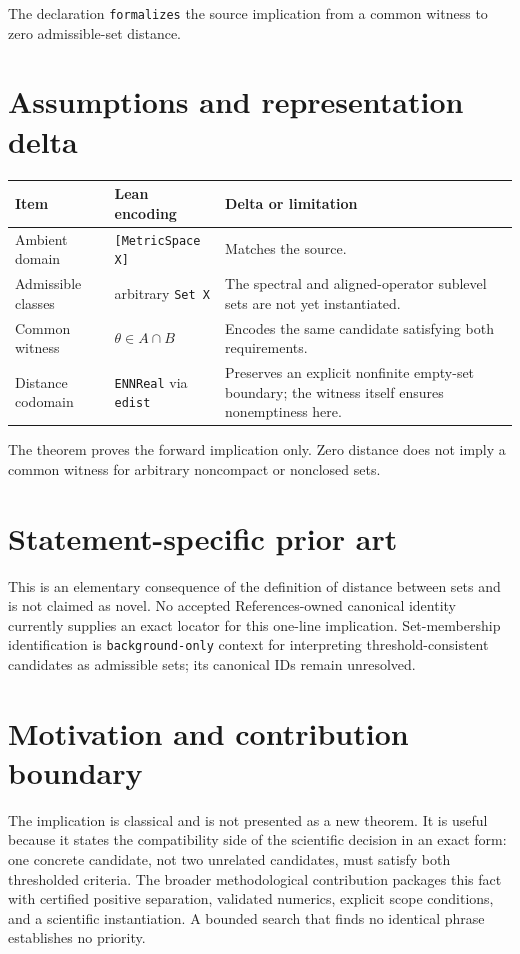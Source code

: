\documentclass[11pt]{article}
\begin{document}
The declaration \texttt{formalizes} the source implication from a common witness to
zero admissible-set distance.

\section{Assumptions and representation delta}

\begin{tabularx}{\textwidth}{@{}l>{\raggedright\arraybackslash}X>{\raggedright\arraybackslash}X@{}}
\toprule
Item & Lean encoding & Delta or limitation \\
\midrule
Ambient domain & \texttt{[MetricSpace X]} & Matches the source. \\
Admissible classes & arbitrary \texttt{Set X} & The spectral and aligned-operator sublevel sets are not yet instantiated. \\
Common witness & $\theta\in A\cap B$ & Encodes the same candidate satisfying both requirements. \\
Distance codomain & \texttt{ENNReal} via \texttt{edist} & Preserves an explicit nonfinite empty-set boundary; the witness itself ensures nonemptiness here. \\
\bottomrule
\end{tabularx}

The theorem proves the forward implication only. Zero distance does not imply a common
witness for arbitrary noncompact or nonclosed sets.

\section{Statement-specific prior art}

This is an elementary consequence of the definition of distance between sets and is not
claimed as novel. No accepted References-owned canonical identity currently supplies an
exact locator for this one-line implication. Set-membership identification is
\texttt{background-only} context for interpreting threshold-consistent candidates as
admissible sets; its canonical IDs remain unresolved.

\section{Motivation and contribution boundary}

The implication is classical and is not presented as a new theorem. It is useful because
it states the compatibility side of the scientific decision in an exact form: one
concrete candidate, not two unrelated candidates, must satisfy both thresholded criteria.
The broader methodological contribution packages this fact with certified positive
separation, validated numerics, explicit scope conditions, and a scientific instantiation.
A bounded search that finds no identical phrase establishes no priority.
\end{document}
